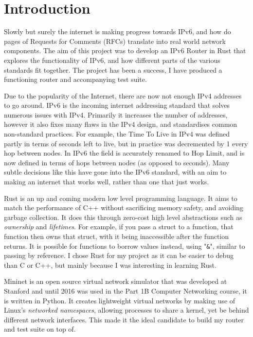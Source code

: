 \documentclass[12pt,a4paper,twoside,openright]{report}
\begin{document}

\pagestyle{headings}

\chapter{Introduction}
Slowly but surely the internet is making progress towards IPv6, and how do pages of Requests for Comments (RFCs) translate into real world network components. The aim of this project was to develop an IPv6 Router in Rust that explores the functionality of IPv6, and how different parts of the various standards fit together. The project has been a success, I have produced a functioning router and accompanying test suite.

\bigskip

Due to the popularity of the Internet, there are now not enough IPv4 addresses to go around. IPv6 is the incoming internet addressing standard that solves numerous issues with IPv4.  Primarily it increases the number of addresses, however it also fixes many flaws in the IPv4 design, and standardises common non-standard practices. For example, the Time To Live in IPv4 was defined partly in terms of seconds left to live\cite{ipv4_rfc}, but in practice was decremented by 1 every hop between nodes. In IPv6 the field is accurately renamed to Hop Limit, and is now defined in terms of hops between nodes (as opposed to seconds). Many subtle decisions like this have gone into the IPv6 standard, with an aim to making an internet that works well, rather than one that just works.

\bigskip

Rust\cite{rust} is an up and coming modern low level programming language. It aims to match the performance of C++ without sacrificing memory safety, and avoiding garbage collection. It does this through zero-cost high level abstractions such as \textit{ownership} and \textit{lifetimes}. For example, if you pass a struct to a function, that function then owns that struct, with it being inaccessible after the function returns. It is possible for functions to borrow values instead, using "\texttt{\&}", similar to passing by reference.  I chose Rust for my project as it can be easier to debug than C or C++, but mainly because I was interesting in learning Rust.

\bigskip

Mininet\cite{mininet} is an open source virtual network simulator that was developed at Stanford and until 2016 was used in the Part 1B Computer Networking course, it is written in Python.  It creates lightweight virtual networks by making use of Linux's \textit{networked namespaces}, allowing processes to share a kernel, yet be behind different network interfaces. This made it the ideal candidate to build my router and test suite on top of.
\end{document}

